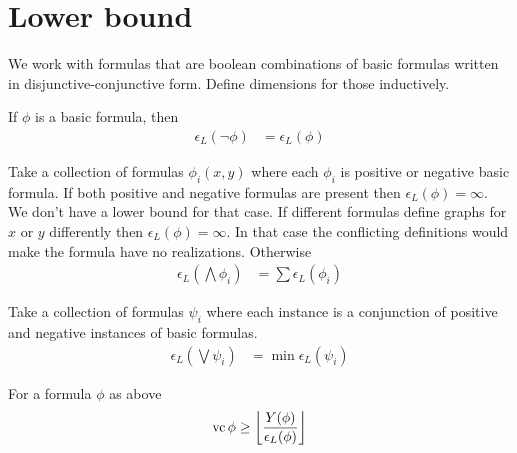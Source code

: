 \documentclass{amsart}
\providecommand{\floor}[1]{\left \lfloor #1 \right \rfloor }
\begin{document}
\section{Lower bound}

We work with formulas that are boolean combinations of basic formulas written in disjunctive-conjunctive form.
Define dimensions for those inductively.

\begin{Definition}[Negation]
	If $\phi$ is a basic formula, then
	\begin{align*}
		\epsilon_L(\neg \phi) &= \epsilon_L(\phi)
	\end{align*}
\end{Definition}

\begin{Definition}[Conjunction]
	Take a collection of formulas $\phi_i(x, y)$ where each $\phi_i$ is positive or negative basic formula.
	If both positive and negative formulas are present then $\epsilon_L(\phi) = \infty$.
	We don't have a lower bound for that case.
	If different formulas define graphs for $x$ or $y$ differently then $\epsilon_L(\phi) = \infty$.
	In that case the conflicting definitions would make the formula have no realizations.
	Otherwise
	\begin{align*}
		\epsilon_L(\bigwedge \phi_i) &= \sum \epsilon_L(\phi_i)
	\end{align*}
\end{Definition}

\begin{Definition} [Disjunction]
	Take a collection of formulas $\psi_i$ where each instance is a conjunction of positive and negative instances of basic formulas.
	\begin{align*}
		\epsilon_L(\bigvee \psi_i) &= \min \epsilon_L(\psi_i)
	\end{align*}
\end{Definition}

\begin{Theorem}
	For a formula $\phi$ as above
	\begin{align*}
		\vc \phi \geq \floor{\frac{Y(\phi)}{\epsilon_L(\phi)}}
	\end{align*}
\end{Theorem}


\end{document}
